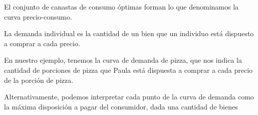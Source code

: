 \documentclass{beamer}
\begin{document}
\begin{frame}
    \begin{center}
      El conjunto de canastas de consumo óptimas forman lo que denominamos la curva precio-consumo.
    \end{center}
  \begin{boxB}
    \begin{center}
      La demanda individual es la cantidad de un bien que un individuo está dispuesto a comprar a cada precio.
    \end{center}
  \end{boxB}
  \begin{center}
    En nuestro ejemplo, tenemos la curva de demanda de pizza, que nos indica la cantidad de porciones de pizza que Paula está dispuesta a comprar a cada precio de la porción de pizza.
  \end{center}
  \begin{boxA}
    \begin{center}
      Alternativamente, podemos interpretar cada punto de la curva de demanda como la máxima disposición a pagar del consumidor, dada una cantidad de bienes
    \end{center}
  \end{boxA}
\end{frame}
\end{document}
